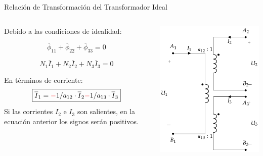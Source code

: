 \documentclass[aspectratio=169, usenames,svgnames,dvipsnames]{beamer}
\begin{document}
\begin{frame}[label={sec:orgd3f836b}]{Relación de Transformación del Transformador Ideal}
\begin{columns}
\begin{column}{0.5\columnwidth}
Debido a las condiciones de idealidad:

\[
  \overline{\phi}_{11} + \overline{\phi}_{22} + \overline{\phi}_{33} = 0
\]

\[
  N_1 \overline{I}_1 + N_ 2\overline{I}_2 + N_3 \overline{I}_{3} = 0
\]

En términos de corriente:
\[
  \boxed{\overline{I}_1 = {\color{red}-} 1/a_{12} \cdot \overline{I}_2 {\color{red}-} 1/a_{13} \cdot  \overline{I}_3}
\]
Si las corrientes \(I_2\) e \(I_3\) son salientes, en la ecuación anterior los signos serán positivos.
\end{column}
\begin{column}{0.5\columnwidth}
\begin{center}
\includegraphics[height=0.9\textheight]{../figs/TrafoIdealVariosDevanados.pdf}
\end{center}
\end{column}
\end{columns}
\end{frame}
\end{document}
